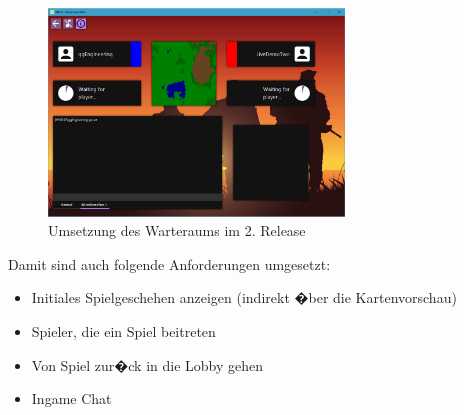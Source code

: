 \documentclass[12pt, titlepage]{scrartcl}
\begin{document}
			\begin{figure}[H] 
				\centering
				\includegraphics[width=0.7\textwidth]{WaitingRoom_final.PNG}
				\caption{Umsetzung des Warteraums im 2. Release}
				\label{ImplementationWaitingRoom}
			\end{figure}
			Damit sind auch folgende Anforderungen umgesetzt:
			\begin{itemize}
				\item Initiales Spielgeschehen anzeigen (indirekt �ber die Kartenvorschau)
				\item Spieler, die ein Spiel beitreten
				\item Von Spiel zur�ck in die Lobby gehen
				\item Ingame Chat
			\end{itemize}
			
\end{document}
